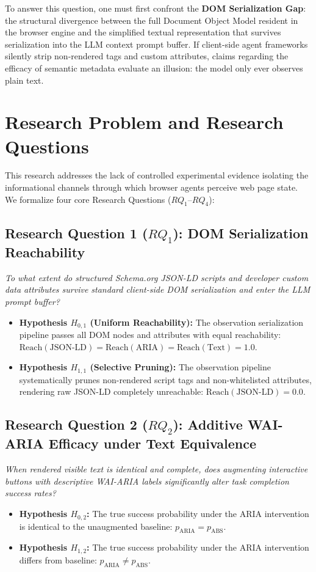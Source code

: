 \documentclass[11pt,a4paper]{article}
\begin{document}
To answer this question, one must first confront the \textbf{DOM Serialization Gap}: the structural divergence between the full Document Object Model resident in the browser engine and the simplified textual representation that survives serialization into the LLM context prompt buffer. If client-side agent frameworks silently strip non-rendered tags and custom attributes, claims regarding the efficacy of semantic metadata evaluate an illusion: the model only ever observes plain text.

\section{Research Problem and Research Questions}
\label{sec:rq}

This research addresses the lack of controlled experimental evidence isolating the informational channels through which browser agents perceive web page state. We formalize four core Research Questions ($RQ_1$--$RQ_4$):

\subsection{Research Question 1 ($RQ_1$): DOM Serialization Reachability}
\textit{To what extent do structured Schema.org JSON-LD scripts and developer custom data attributes survive standard client-side DOM serialization and enter the LLM prompt buffer?}
\begin{itemize}
    \item \textbf{Hypothesis $H_{0,1}$ (Uniform Reachability):} The observation serialization pipeline passes all DOM nodes and attributes with equal reachability: $\text{Reach}(\text{JSON-LD}) = \text{Reach}(\text{ARIA}) = \text{Reach}(\text{Text}) = 1.0$.
    \item \textbf{Hypothesis $H_{1,1}$ (Selective Pruning):} The observation pipeline systematically prunes non-rendered script tags and non-whitelisted attributes, rendering raw JSON-LD completely unreachable: $\text{Reach}(\text{JSON-LD}) = 0.0$.
\end{itemize}

\subsection{Research Question 2 ($RQ_2$): Additive WAI-ARIA Efficacy under Text Equivalence}
\textit{When rendered visible text is identical and complete, does augmenting interactive buttons with descriptive WAI-ARIA labels significantly alter task completion success rates?}
\begin{itemize}
    \item \textbf{Hypothesis $H_{0,2}$:} The true success probability under the \textsc{ARIA} intervention is identical to the unaugmented baseline: $p_{\text{ARIA}} = p_{\text{ABS}}$.
    \item \textbf{Hypothesis $H_{1,2}$:} The true success probability under the \textsc{ARIA} intervention differs from baseline: $p_{\text{ARIA}} \neq p_{\text{ABS}}$.
\end{itemize}
\end{document}
